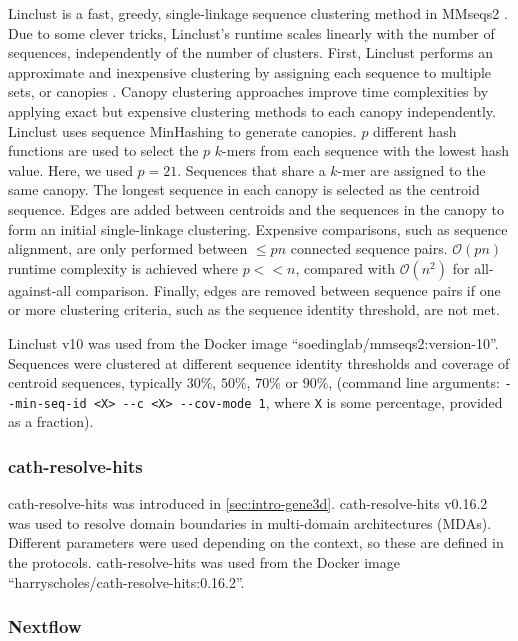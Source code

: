 Linclust \cite{Steinegger2018} is a fast, greedy, single-linkage sequence clustering method in MMseqs2 \cite{Steinegger2017}. Due to some clever tricks, Linclust's runtime scales linearly with the number of sequences, independently of the number of clusters. First, Linclust performs an approximate and inexpensive clustering by assigning each sequence to multiple sets, or canopies \cite{McCallum2000}. Canopy clustering approaches improve time complexities by applying exact but expensive clustering methods to each canopy independently. Linclust uses sequence MinHashing \cite{Broder1998,Broder1997,Buhler2001,Ondov2016,Ren2018} to generate canopies. $p$ different hash functions are used to select the $p$ $k$-mers from each sequence with the lowest hash value. Here, we used $p = 21$. Sequences that share a $k$-mer are assigned to the same canopy. The longest sequence in each canopy is selected as the centroid sequence. Edges are added between centroids and the sequences in the canopy to form an initial single-linkage clustering. Expensive comparisons, such as sequence alignment, are only performed between $\le pn$ connected sequence pairs. $\mathcal{O}(pn)$ runtime complexity is achieved where $p << n$, compared with $\mathcal{O}(n^2)$ for all-against-all comparison. Finally, edges are removed between sequence pairs if one or more clustering criteria, such as the sequence identity threshold, are not met.

Linclust v10 was used from the Docker image ``soedinglab/mmseqs2:version-10''. Sequences were clustered at different sequence identity thresholds and coverage of centroid sequences, typically $30\%$, $50\%$, $70\%$ or $90\%$, (command line arguments: \texttt{-\/-min-seq-id\ \textless{}X\textgreater{}\ -\/-c\ \textless{}X\textgreater{}\ -\/-cov-mode\ 1}, where \texttt{X} is some percentage, provided as a fraction).

\subsubsection{cath-resolve-hits}

cath-resolve-hits was introduced in \ref{sec:intro-gene3d}. cath-resolve-hits \cite{Lewis2019} v0.16.2 was used to resolve domain boundaries in multi-domain architectures (MDAs). Different parameters were used depending on the context, so these are defined in the protocols. cath-resolve-hits was used from the Docker image ``harryscholes/cath-resolve-hits:0.16.2''.

\subsubsection{Nextflow}

